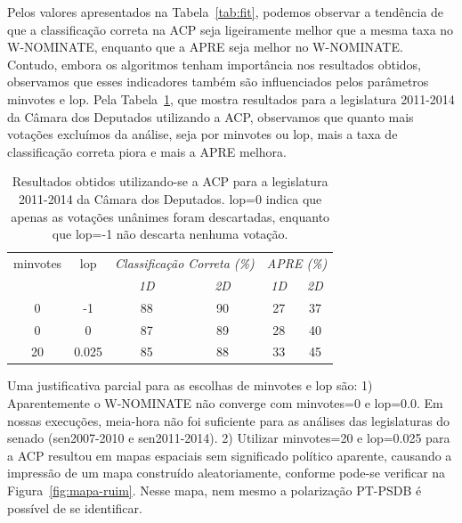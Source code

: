 \documentclass[a4paper, 12pt]{article}
\newcommand\wnominate{W-NOMINATE\xspace}
\begin{document}
Pelos valores apresentados na Tabela~\ref{tab:fit}, podemos observar a tendência de que a classificação correta na ACP seja ligeiramente melhor que a mesma taxa no \wnominate, enquanto que a APRE seja melhor no \wnominate. Contudo, embora os algoritmos tenham importância nos resultados obtidos, observamos que esses indicadores também são influenciados pelos parâmetros \textsf{minvotes} e \textsf{lop}. Pela Tabela~\ref{tab:variando-lop}, que mostra resultados para a legislatura 2011-2014 da Câmara dos Deputados utilizando a ACP, observamos que quanto mais votações excluímos da análise, seja por \textsf{minvotes} ou \textsf{lop}, mais a taxa de classificação correta piora e mais a APRE melhora.


\begin{table}
\centering
\begin{tabular}{c c c c c c}
\textsf{minvotes} & \textsf{lop} & \multicolumn{2}{c}{\itshape Classificação Correta (\%)} & \multicolumn{2}{c}{\itshape APRE (\%)} \\
 & & \itshape 1D & \itshape 2D & \itshape 1D & \itshape 2D \\
\hline
0 & -1     & 88 & 90 & 27 & 37 \\
0 &  0     & 87 & 89 & 28 & 40\\
20 & 0.025 & 85 & 88 & 33 & 45\\
\end{tabular} 
\caption{Resultados obtidos utilizando-se a ACP para a legislatura 2011-2014 da Câmara dos Deputados. \textsf{lop=0} indica que apenas as votações unânimes foram descartadas, enquanto que \textsf{lop=-1} não descarta nenhuma votação.}
\label{tab:variando-lop}
\end{table}

Uma justificativa parcial para as escolhas de \textsf{minvotes} e \textsf{lop} são: 1) Aparentemente o \wnominate não converge com \textsf{minvotes=0} e \textsf{lop=0.0}. Em nossas execuções, meia-hora não foi suficiente para as análises das legislaturas do senado (sen2007-2010 e sen2011-2014). 2) Utilizar \textsf{minvotes=20} e \textsf{lop=0.025} para a ACP resultou em mapas espaciais sem significado político aparente, causando a impressão de um mapa construído aleatoriamente, conforme pode-se verificar na Figura~\ref{fig:mapa-ruim}. Nesse mapa, nem mesmo a polarização PT-PSDB é possível de se identificar.
\end{document}
